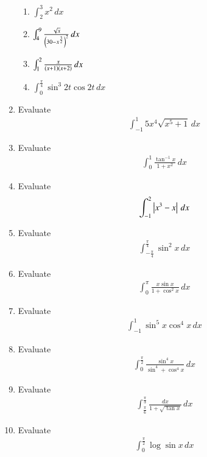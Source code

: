 \begin{enumerate}[label=\arabic*.,ref=\thesubsection.\theenumi]
\begin{enumerate}
%
\item  $\int_{2}^{3}x^2 \,dx$
\item  $\int_{4}^{9}\frac{\sqrt{x}}{\left(30-x^{\frac{3}{2}}\right)^2}\,dx$
\item  $\int_{1}^{2}\frac{x}{\left(x+1\right)\left(x+2\right)}\,dx$
\item  $\int_{0}^{\frac{\pi}{4}}\sin^3 2t \cos 2t\,dx$
%
\end{enumerate}
%
\item Evaluate
\begin{align}
\int_{-1}^{1} 5x^4\sqrt{x^5+1}\,dx
\end{align}
%
\item Evaluate
\begin{align}
\int_{0}^{1} \frac{\tan ^{-1}x}{1+x^2}\,dx
\end{align}
%
\item Evaluate
\begin{align}
\int_{-1}^{2} \left\vert x^3-x\right\vert\,dx
\end{align}
%
\item Evaluate
\begin{align}
\int_{-\frac{\pi}{4}}^{\frac{\pi}{4}}\sin^2 x\,dx
\end{align}
%
\item Evaluate
\begin{align}
\int_{0}^{\pi}\frac{x\sin x}{1+\cos^2 x}\,dx
\end{align}
%
\item Evaluate
\begin{align}
\int_{-1}^{1}\sin^5 x \cos^{4} x\,dx
\end{align}
%
\item Evaluate
\begin{align}
\int_{0}^{\frac{\pi}{2}}\frac{\sin^4 x}{\sin^4+\cos^4 x}\,dx
\end{align}
%
\item Evaluate
\begin{align}
\int_{\frac{\pi}{6}}^{\frac{\pi}{3}}\frac{dx}{1+\sqrt{\tan x}}\,dx
\end{align}
%
\item Evaluate
\begin{align}
\int_{0}^{\frac{\pi}{2}}\log \sin x \,dx
\end{align}
%

\end{enumerate}
